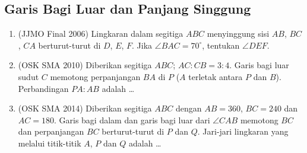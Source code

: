 \documentclass[12pt]{scrartcl}
\begin{document}
\subsection{Garis Bagi Luar dan Panjang Singgung}
\begin{enumerate}

	\item (JJMO Final 2006)
	Lingkaran dalam segitiga $ABC$ menyinggung sisi $AB$, $BC$, $CA$
	berturut-turut di $D$, $E$, $F$.
	Jika $\angle BAC = 70^\circ$, tentukan $\angle DEF$.

	\item (OSK SMA 2010)
	Diberikan segitiga $ABC$; $AC:CB = 3:4$.
	Garis bagi luar sudut $C$ memotong perpanjangan $BA$ di $P$
	($A$ terletak antara $P$ dan $B$).
	Perbandingan $PA:AB$ adalah \dots

	\item (OSK SMA 2014)
	Diberikan segitiga $ABC$ dengan $AB = 360$, $BC = 240$ dan $AC = 180$.
	Garis bagi dalam dan garis bagi luar dari $\angle CAB$ memotong $BC$
	dan perpanjangan $BC$ berturut-turut di $P$ dan $Q$.
	Jari-jari lingkaran yang melalui titik-titik $A$, $P$ dan $Q$ adalah \dots

\end{enumerate}
\end{document}
